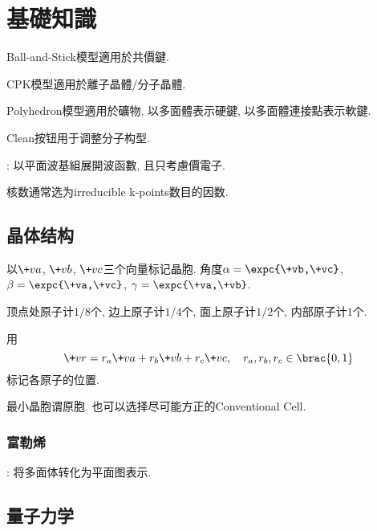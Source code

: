 \documentclass[hidelinks]{ctexart}
\begin{document}
\section{基礎知識} %
\label{sec:基礎知識}

\begin{cenum}
    \item Ball-and-Stick模型適用於共價鍵.
    \item CPK模型適用於離子晶體/分子晶體.
    \item Polyhedron模型適用於礦物, 以多面體表示硬鍵, 以多面體連接點表示軟鍵.
    \item Clean按钮用于调整分子构型.
\end{cenum}
: 以平面波基組展開波函數, 且只考慮價電子.
\par
\begin{cenum}
    \item 核数通常选为irreducible k-points数目的因数.
\end{cenum}

\subsection{晶体结构} %
\label{sub:晶体结构}

\begin{cenum}
    \item 以$\+va$, $\+vb$, $\+vc$三个向量标记晶胞. 角度$\alpha = \expc{\+vb,\+vc}$, $\beta = \expc{\+va,\+vc}$, $\gamma = \expc{\+va,\+vb}$.
    \item 顶点处原子计$1/8$个, 边上原子计$1/4$个, 面上原子计$1/2$个, 内部原子计$1$个.
    \item 用
    \[ \+vr = r_a \+va + r_b \+vb + r_c \+vc,\quad r_a,r_b,r_c\in \brac{0,1} \]
    标记各原子的位置.
    \item 最小晶胞谓原胞. 也可以选择尽可能方正的Conventional Cell.
\end{cenum}

\subsubsection{富勒烯} %
\label{ssub:富勒烯}

: 将多面体转化为平面图表示.



\subsection{量子力学} %
\label{sub:量子力学}
\end{document}
